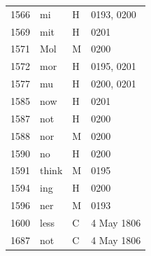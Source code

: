 \begin{longtable}{@{}rlll@{}}
1566 & mi & H & 0193, 0200 \\
1569 & mit & H & 0201 \\
1571 & Mol & M & 0200 \\
1572 & mor & H & 0195, 0201 \\
1577 & mu & H & 0200, 0201 \\
1585 & now & H & 0201 \\
1587 & not & H & 0200 \\
1588 & nor & M & 0200 \\
1590 & no & H & 0200 \\
1591 & think & M & 0195 \\
1594 & ing & H & 0200 \\
1596 & ner & M & 0193 \\
1600 & less & C & 4 May 1806 \\
1687 & not & C & 4 May 1806 \\
\bottomrule
\end{longtable}
